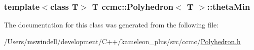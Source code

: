 \hypertarget{classccmc_1_1_polyhedron_a6f7b5d5e06047d56e6ec6c01ce992041}{
\subsubsection[{theta\-Min}]{\setlength{\rightskip}{0pt plus 5cm}template$<$class T$>$ T {\bf ccmc\-::\-Polyhedron}$<$ T $>$\-::theta\-Min}}\label{classccmc_1_1_polyhedron_a6f7b5d5e06047d56e6ec6c01ce992041}


The documentation for this class was generated from the following file\-:\begin{DoxyCompactItemize}
\item 
/\-Users/mswindell/development/\-C++/kameleon\-\_\-plus/src/ccmc/\hyperlink{_polyhedron_8h}{Polyhedron.\-h}\end{DoxyCompactItemize}
